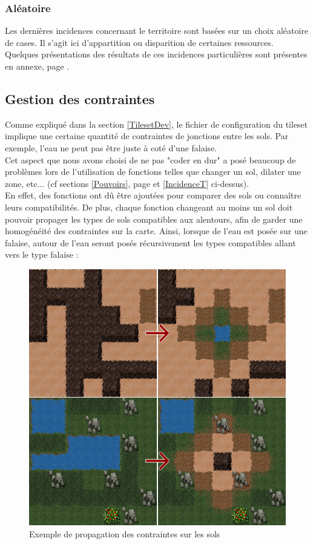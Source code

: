 \documentclass[a4paper]{memoir}
\begin{document}
				\subsubsection{Aléatoire}
					Les dernières incidences concernant le territoire sont basées sur un choix aléatoire de cases. Il s'agit ici d'appartition ou disparition de certaines ressources.\\
					Quelques présentations des résultats de ces incidences particulières sont présentes en annexe, page \pageref{fig:aleatoire}.
			
			\subsection{Gestion des contraintes}
				Comme expliqué dans la section \ref{TilesetDev}, le fichier de configuration du tileset implique une certaine quantité de contraintes de jonctions entre les sols. Par exemple, l'eau ne peut pas être juste à coté d'une falaise.\\
				Cet aspect que nous avons choisi de ne pas "coder en dur" a posé beaucoup de problèmes lors de l'utilisation de fonctions telles que changer un sol, dilater une zone, etc... (cf sections \ref{Pouvoirs}, page \pageref{Pouvoirs} et \ref{IncidenceT} ci-dessus).\\
				En effet, des fonctions ont dû être ajoutées pour comparer des sols ou connaître leurs compatibilités. De plus, chaque fonction changeant au moins un sol doit pouvoir propager les types de sols compatibles aux alentours, afin de garder une homogénéité des contraintes sur la carte. Ainsi, lorsque de l'eau est posée sur une falaise, autour de l'eau seront posés récursivement les types compatibles allant vers le type falaise :\\
				\begin{figure}[H]
					\begin{center}
						\includegraphics[scale=0.35]{img/SpreadGround.png} 
					\end{center}
					\label{fig:spread}
					\caption{Exemple de propagation des contraintes sur les sols}
				\end{figure}
\end{document}
